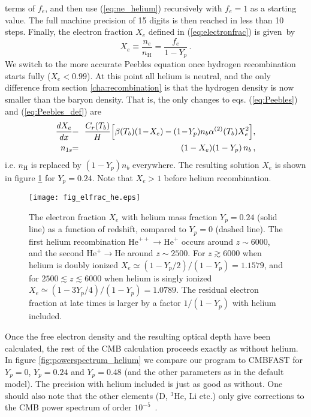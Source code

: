 \documentclass[twocolumn,nofootinbib,amsmath,amssymb]{revtex4}
\newcommand{\be}{\begin{equation}}
\newcommand{\ee}{\end{equation}}
\newcommand{\ba}{\begin{eqnarray}}
\newcommand{\ea}{\end{eqnarray}}
\newcommand{\hs}{\hspace{-1.12mm}}
\newcommand{\eq}{\hs & = & \hs}
\newcommand{\hydr}{\mathrm{H}}
\newcommand{\he}{\mathrm{He}}
\begin{document}
terms of $f_e$, and then use (\ref{eq:ne_helium}) recursively with $f_e = 1$ as
a starting value. The full machine precision of 15 digits is then reached in
less than 10 steps. Finally, the electron fraction $X_e$ defined in
(\ref{eq:electronfrac}) is given~by
\be
  X_e \equiv \frac{n_e}{n_\hydr} = \frac{f_e}{1-Y_p} \, .
\ee
We switch to the more accurate Peebles equation once hydrogen recombination
starts fully ($X_e < 0.99$). At this point all helium is neutral, and the only
difference from section \ref{cha:recombination} is that the hydrogen density is
now smaller than the baryon density. That is, the only changes to eqs.
(\ref{eq:Peebles}) and (\ref{eq:Peebles_def}) are
\ba
  \frac{dX_e}{dx} \eq \frac{C_r(T_b)}{H} \!\left[
    \beta(T_b) (1\!-\!X_e) - (1\!-\!Y_p) n_b \alpha^{(2)}(T_b) X_e^2
  \right] \! , \nonumber \\
  n_{1s} \eq (1-X_e) (1-Y_p) \, n_b \, ,
  \label{eq:Peebles_helium}
\ea
i.e. $n_\hydr$ is replaced by $(1-Y_p) n_b$ everywhere. The resulting solution
$X_e$ is shown in figure \ref{fig:electronfrac_helium} for $Y_p = 0.24$. Note
that $X_e > 1$ before helium recombination.

\begin{figure}[!h]
  \begin{center}
    \texttt{[image: fig\_elfrac\_he.eps]}
  \end{center}
  \vspace{-6mm}
  \caption{The electron fraction $X_e$ with helium mass fraction $Y_p = 0.24$
  (solid line) as a function of redshift, compared to $Y_p = 0$ (dashed line).
  The first helium recombination $\he^{++} \to \he^+$ occurs
  around $z \sim 6000$, and the second $\he^+ \to \he$ around
  $z \sim 2500$. For $z \gtrsim 6000$ when helium is doubly ionized $X_e \simeq
  (1-Y_p/2)/(1-Y_p) = 1.1579$, and for $2500 \lesssim z \lesssim 6000$ when
  helium is singly ionized $X_e \simeq (1-3Y_p/4)/(1-Y_p) = 1.0789$. The
  residual electron fraction at late times is larger by a factor $1/(1-Y_p)$
  with helium included.}
  \label{fig:electronfrac_helium}
\end{figure}

Once the free electron density and the resulting optical depth have been
calculated, the rest of the CMB calculation proceeds exactly as without helium.
In figure \ref{fig:powerspectrum_helium} we compare our program to CMBFAST for
$Y_p = 0$, $Y_p = 0.24$ and $Y_p = 0.48$ (and the other parameters as in the
default model). The precision with helium included is just as good as without.
One should also note that the other elements (D, $^3\he$, Li etc.) only give
corrections to the CMB power spectrum of order $10^{-5}$~\cite{Hu_Scott}.
\end{document}
